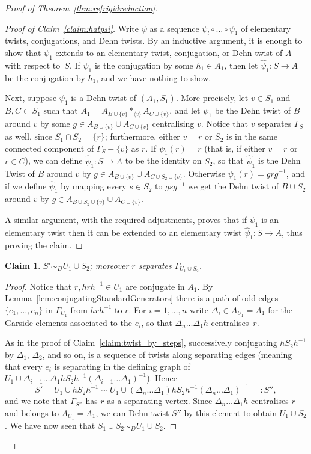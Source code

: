 \documentclass[svgnames]{amsart}
\theoremstyle{plain}
\newtheorem{claim}[thm]{Claim}
\theoremstyle{definition}
\newenvironment{claimproof}{\renewcommand{\qedsymbol}{$\blacksquare$}\begin{proof}}{\end{proof}}
\begin{document}
\begin{proof}[Proof of Theorem~\ref{thm:refrigidreduction}]
    \begin{claimproof}[Proof of Claim~\ref{claim:hatpsi}] Write $\psi$ as a sequence $\psi_l\circ\ldots\circ\psi_1$ of elementary twists, conjugations, and Dehn twists. By an inductive argument, it is enough to show that $\psi_1$ extends to an elementary twist, conjugation, or Dehn twist of $A$ with respect to~$S$. If $\psi_1$ is the conjugation by some $h_1\in A_1$, then let $\hat{\psi}_1: S \rightarrow A$ be the conjugation by $h_1$, and we have nothing to show. 
    
    Next, suppose $\psi_1$ is a Dehn twist of $(A_1,S_1)$. More precisely, let $v\in S_1$ and $B,C\subset S_1$ such that $A_1=A_{B\cup\{v\}}*_{\langle v\rangle} A_{C\cup \{v\}}$, and let $\psi_1$ be the Dehn twist of $B$ around $v$ by some $g\in A_{B\cup\{v\}}\cup A_{C\cup \{v\}}$ centralising $v$. Notice that $v$ separates $\Gamma_S$ as well, since $S_1\cap S_2=\{r\}$; furthermore, either $v=r$ or $S_2$ is in the same connected component of $\Gamma_{S}-\{v\}$ as $r$. If $\psi_1(r)=r$ (that is, if either $v=r$ or $r\in C$), we can define $\hat\psi_1\colon S\to A$ to be the identity on $S_2$, so that $\hat\psi_1$ is the Dehn Twist of $B$ around $v$ by $g\in A_{B\cup\{v\}}\cup A_{C\cup S_2\cup \{v\}}$. Otherwise $\psi_1(r)=grg^{-1}$, and if we define $\hat\psi_1$ by mapping every $s\in S_2$ to $gsg^{-1}$ we get the Dehn twist of $B\cup S_2$ around $v$ by $g\in A_{B\cup S_2\cup\{v\}}\cup A_{C\cup \{v\}}$. 
    
    A similar argument, with the required adjustments, proves that if $\psi_1$ is an elementary twist then it can be extended to an elementary twist $\hat\psi_1\colon S\to A$, thus proving the claim.\end{claimproof}

    \begin{claim}\label{claim:first_gte}
        $S'\sim_D U_1 \cup S_2$; moreover $r$ separates $\Gamma_{U_1\cup S_2}$.
    \end{claim}

    \begin{claimproof}
    Notice that $r, hrh^{-1} \in U_1$ are conjugate in $A_1$. By Lemma~\ref{lem:conjugatingStandardGenerators} there is a path of odd edges $\{e_1,\ldots, e_n\}$ in $\Gamma_{U_1}$ from $hrh^{-1}$ to $r$. For $i =1, \dots, n$ write $\Delta_i\in A_{U_1}=A_1$ for the Garside elements associated to the $e_i$, so that $\Delta_n\dots\Delta_1h$ centralises~$r$. 
    
    As in the proof of Claim~\ref{claim:twist_by_steps}, successively conjugating $hS_2h^{-1}$ by $\Delta_1$, $\Delta_2$, and so on, is a sequence of twists along separating edges (meaning that every $e_i$ is separating in the defining graph of $U_1 \cup \Delta_{i-1}\ldots\Delta_1 hS_2h^{-1}(\Delta_{i-1}\ldots\Delta_1)^{-1}$). Hence $$S'=U_1 \cup hS_2h^{-1} \sim U_1 \cup (\Delta_n\dots\Delta_1)hS_2h^{-1}(\Delta_n\dots\Delta_1)^{-1} =: S'',$$ and we note that $\Gamma_{S''}$ has $r$ as a separating vertex. Since $\Delta_n\dots\Delta_1h$ centralises $r$ and belongs to $A_{U_1}=A_1$, we can Dehn twist $S''$ by this element to obtain $U_1 \cup S_2$. We have now seen that $S_1 \cup S_2 \sim_D U_1 \cup S_2$. 
    

\end{claimproof}
\end{proof}
\end{document}
